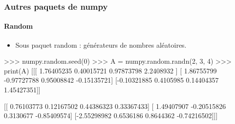 \begin{frame}[fragile]
\frametitle{Autres paquets de numpy}
\framesubtitle{Random}
\begin{itemize}
 \item Sous paquet random : générateurs de nombres aléatoires. 
\end{itemize}
\begin{pythonConsole}
>>> numpy.random.seed(0)
>>> A = numpy.random.randn(2, 3, 4)
>>> print(A)
[[[ 1.76405235  0.40015721  0.97873798  2.2408932 ]
  [ 1.86755799 -0.97727788  0.95008842 -0.15135721]
  [-0.10321885  0.4105985   0.14404357  1.45427351]]

 [[ 0.76103773  0.12167502  0.44386323  0.33367433]
  [ 1.49407907 -0.20515826  0.3130677  -0.85409574]
  [-2.55298982  0.6536186   0.8644362  -0.74216502]]]
\end{pythonConsole}
\end{frame}
